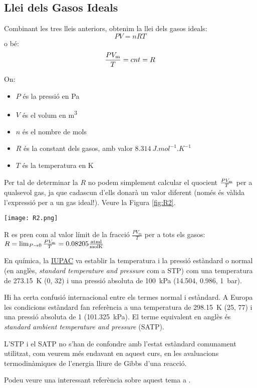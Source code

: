 \subsection{Llei dels Gasos Ideals}
Combinant les tres lleis anteriors, obtenim la llei dels gasos ideals:
\begin{equation}
    P V = n R T
\end{equation}
o bé:
\[\frac{P V_{\rm m}}{T}= cnt = R\]

On:
\begin{itemize}
    \item \( P \) és la pressió en \si{Pa}
    \item \( V \) és el volum en \si{m^3}
    \item \( n \) és el nombre de mols
    \item \( R \) és la constant dels gasos, amb valor \( \SI{8.314}{J.mol^{-1}.K^{-1}} \)
    \item \( T \) és la temperatura en \si{K}
\end{itemize}

Per tal de determinar la $R$ no podem simplement calcular el quocient $\frac{P V_{\rm m}}{T}$ per a qualsevol gas, ja que cadascun d'ells donarà un valor diferent (només és vàlida l'expressió per a un gas ideal!). Veure la Figura \ref{fig:R2}.
\begin{marginfigure}
\centering
\texttt{[image: R2.png]}
\caption[Determinació de la constant dels gasos $R$]{R es pren com al valor límit de la fracció $\frac{P V_m}{T}$ per a tots els gasos: 
$R=\lim_{P \to 0} \frac{P V_{\rm m}}{T}= 0.08205 \frac{{\rm atm l}}{{\rm mol K}}$
}
\label{fig:R2}
\end{marginfigure}

%

\begin{mybox}[title=Condicions normals (o estàndard) de temperatura i pressió]
    En química, la \href{https://iupac.org/}{IUPAC} va establir la temperatura i la pressió estàndard o normal (en anglès, \emph{standard temperature and pressure} com a STP) com una temperatura de \qty{273.15}{\kelvin} (\qty{0}{\degC}, \qty{32}{\degF}) i una pressió absoluta de \qty{100}{\kilo\pascal} (\qty{14.504}{\psi}, \qty{0.986}{\atm}, \qty{1}{\bar}). 
    
    Hi ha certa confusió internacional entre els termes normal i estàndard. A Europa les condicions estàndard fan referència a una temperatura de \qty{298.15}{\kelvin} (\qty{25}{\degC}, \qty{77}{\degF}) i una pressió absoluta de \qty{1}{\atm} (\qty{101.325}{\kilo\pascal}). El terme equivalent en anglès és \emph{standard ambient temperature and pressure} (SATP). 
    
    L'STP i el SATP no s'han de confondre amb l'estat estàndard comunament utilitzat, com veurem més endavant en aquest curs, en les avaluacions termodinàmiques de l'energia lliure de Gibbs d'una reacció.

    Podeu veure una interessant referència sobre aquest tema a \cite{doiron_20_2007}.
\end{mybox}

